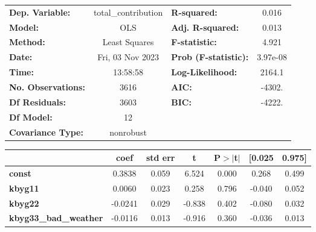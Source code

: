 \begin{center}
\begin{tabular}{lclc}
\toprule
\textbf{Dep. Variable:}                      & total\_contribution & \textbf{  R-squared:         } &     0.016   \\
\textbf{Model:}                              &         OLS         & \textbf{  Adj. R-squared:    } &     0.013   \\
\textbf{Method:}                             &    Least Squares    & \textbf{  F-statistic:       } &     4.921   \\
\textbf{Date:}                               &   Fri, 03 Nov 2023  & \textbf{  Prob (F-statistic):} &  3.97e-08   \\
\textbf{Time:}                               &       13:58:58      & \textbf{  Log-Likelihood:    } &    2164.1   \\
\textbf{No. Observations:}                   &          3616       & \textbf{  AIC:               } &    -4302.   \\
\textbf{Df Residuals:}                       &          3603       & \textbf{  BIC:               } &    -4222.   \\
\textbf{Df Model:}                           &            12       & \textbf{                     } &             \\
\textbf{Covariance Type:}                    &      nonrobust      & \textbf{                     } &             \\
\bottomrule
\end{tabular}
\begin{tabular}{lcccccc}
                                             & \textbf{coef} & \textbf{std err} & \textbf{t} & \textbf{P$> |$t$|$} & \textbf{[0.025} & \textbf{0.975]}  \\
\midrule
\textbf{const}                               &       0.3838  &        0.059     &     6.524  &         0.000        &        0.268    &        0.499     \\
\textbf{kbyg11}                              &       0.0060  &        0.023     &     0.258  &         0.796        &       -0.040    &        0.052     \\
\textbf{kbyg22}                              &      -0.0241  &        0.029     &    -0.838  &         0.402        &       -0.080    &        0.032     \\
\textbf{kbyg33\_bad\_weather}                &      -0.0116  &        0.013     &    -0.916  &         0.360        &       -0.036    &        0.013     \\

\end{tabular}
\end{center}
